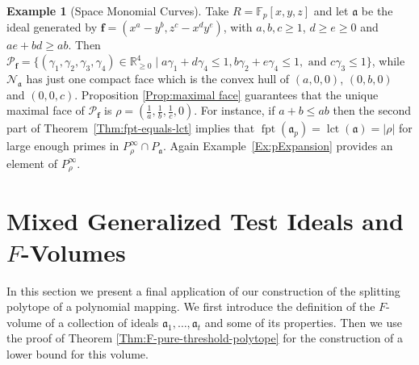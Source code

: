 \documentclass[12pt]{amsart}
\theoremstyle{definition}
\newtheorem{example}[theorem]{Example}
\numberwithin{equation}{subsection}
\DeclareMathOperator{\fpt}{fpt}
\newcommand{\lct}{{\operatorname{lct}}}
\newcommand{\FF}{\mathbb{F}}
\newcommand{\RR}{\mathbb{R}}
\newcommand{\fa}{\mathfrak{a}}
\newcommand{\SP}{\mathcal{P}}
\newcommand{\N}{\mathcal{N}}
\newcommand{\Bf}{\boldsymbol{f}}
\renewcommand{\!}[1]{{\color{red}\text{\Huge$\star$ }#1}}
\begin{document}
\begin{example}[Space Monomial Curves]\label{Exam:SpaceMonCurves}
	Take $R=\FF_p[x,y,z]$ and let $\fa$ be the ideal generated by $\Bf=(x^a-y^b,z^c-x^dy^e)$, with $a,b,c\geq 1$, $d\geq e\geq 0$ and  $ae+bd\geq ab$. Then $\SP_{\Bf}=\{(\gamma_1,\gamma_2,\gamma_3,\gamma_4)\in \RR_{\geq 0}^4 \mid a\gamma_1+d\gamma_4 \leq 1, b\gamma_2+e\gamma_4 \leq 1, \text{ and } c\gamma_3 \leq 1 \}$, while $\N_{\fa}$ has just one compact face which is the convex hull of $(a,0,0)$, $(0,b,0)$ and $(0,0,c)$. Proposition \ref{Prop:maximal face} guarantees that the unique maximal face of $\SP_{\Bf}$ is $\rho=(\frac{1}{a},\frac{1}{b},\frac{1}{c},0)$. For instance, if 
	$a+b\leq ab$ then the second part of Theorem~\ref{Thm:fpt-equals-lct} implies that $\fpt(\fa_p)=\lct(\fa)=|\rho|$ for large enough primes in $P_\rho^\infty\cap P_\fa$. Again Example~\ref{Ex:pExpansion} provides an element of $P_\rho^\infty$.
\end{example}

\section{Mixed Generalized Test Ideals and $F$-Volumes}

In this section we present a final application of our construction of the splitting polytope of a polynomial mapping. We first introduce the
definition of the $F$-volume of a collection of ideals $\mathfrak{a}_1, \ldots, \mathfrak{a}_t$ and some of its properties. Then we use the proof of Theorem \ref{Thm:F-pure-threshold-polytope} for the construction of a lower bound for this volume.
\end{document}
